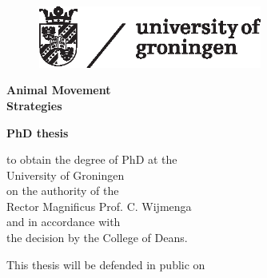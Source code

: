 \thispagestyle{empty}
\begin{titlepage}
    \thispagestyle{empty}
    \begin{center}

        \hfill
        \begin{figure}
            \includegraphics[width=7.38cm,height=2.03cm]{figures/rug_logo.eps}
        \end{figure}

        \vspace{8mm}

        {
           {\fontsize{30}{30} \bfseries{Animal Movement\\Strategies}\par}\par
        }

        \vspace{12mm}

        {
           {\fontsize{15}{15} \bfseries{PhD thesis}\par}\par
        }

        \vspace{8mm}

        {\fontsize{14}{15}
            {to obtain the degree of PhD at the\\
            University of Groningen\\
            on the authority of the\\
            Rector Magnificus Prof. C. Wijmenga\\
            and in accordance with\\
            the decision by the College of Deans.}

            \vspace{1.5mm}

            This thesis will be defended in public on

}
\end{center}
\end{titlepage}
